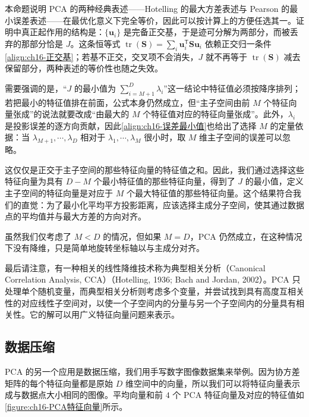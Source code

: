 \documentclass[../../main.tex]{subfiles}
\begin{document}
\begin{remark}
本命题说明 PCA 的两种经典表述——Hotelling 的最大方差表述与 Pearson 的最小误差表述——在最优化意义下完全等价，因此可以按计算上的方便任选其一。证明中真正起作用的结构是：$\{\bm{u}_i\}$ 是完备正交基，于是迹可分解为两部分，而被丢弃的那部分恰是 $J$。这条恒等式 $\operatorname{tr}(\bm{S})=\sum_{i}\bm{u}_i^{\mathsf T}\bm{S}\bm{u}_i$ 依赖正交归一条件\eqref{align:ch16-正交基}；若基不正交，交叉项不会消失，$J$ 就不再等于 $\operatorname{tr}(\bm{S})$ 减去保留部分，两种表述的等价性也随之失效。

需要强调的是，“$J$ 的最小值为 $\sum_{i=M+1}^{D}\lambda_i$”这一结论中特征值必须按降序排列；若把最小的特征值排在前面，公式本身仍然成立，但“主子空间由前 $M$ 个特征向量张成”的说法就要改成“由最大的 $M$ 个特征值对应的特征向量张成”。此外，$\lambda_i$ 是投影误差的逐方向贡献，因此\eqref{align:ch16-误差最小值}也给出了选择 $M$ 的定量依据：当 $\lambda_{M+1},\cdots,\lambda_D$ 相对于 $\lambda_1,\cdots,\lambda_M$ 很小时，取 $M$ 维主子空间的误差可以忽略。
\end{remark}

这仅仅是正交于主子空间的那些特征向量的特征值之和。因此，我们通过选择这些特征向量为具有 $D-M$ 个最小特征值的那些特征向量，得到了 $J$ 的最小值，定义主子空间的特征向量是对应于 $M$ 个最大特征值的那些特征向量。这个结果符合我们的直觉：为了最小化平均平方投影距离，应该选择主成分子空间，使其通过数据点的平均值并与最大方差的方向对齐。

虽然我们仅考虑了 $M<D$ 的情况，但如果 $M=D$，PCA 仍然成立，在这种情况下没有降维，只是简单地旋转坐标轴以与主成分对齐。

最后请注意，有一种相关的线性降维技术称为典型相关分析（Canonical Correlation Analysis, CCA）（Hotelling, 1936; Bach and Jordan, 2002）。PCA 只处理单个随机变量，而典型相关分析则考虑多个变量，并尝试找到具有高度互相关性的对应线性子空间对，以使一个子空间内的分量与另一个子空间内的分量具有相关性。它的解可以用广义特征向量问题来表示。

\subsection{数据压缩}\label{subsection:ch16-数据压缩}

PCA 的另一个应用是数据压缩，我们用手写数字图像数据集来举例。因为协方差矩阵的每个特征向量都是原始 $D$ 维空间中的向量，所以我们可以将特征向量表示成与数据点大小相同的图像。平均向量和前 $4$ 个 PCA 特征向量及对应的特征值如\cref{figure:ch16-PCA特征向量}所示。
\end{document}

